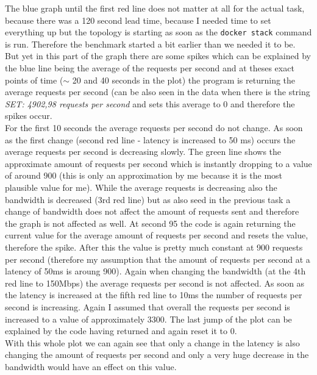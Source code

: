 \documentclass{article}
\begin{document}
	\begin{adjustwidth}{2em}{2em}
		The blue graph until the first red line does not matter at all for the actual task, because there was a 120 second lead time, because I needed time to set everything up but the topology is starting as soon as the \texttt{docker stack} command is run. Therefore the benchmark started a bit earlier than we needed it to be. But yet in this part of the graph there are some spikes which can be explained by the blue line being the average of the requests per second and at theses exact points of time ($\sim$ 20 and 40 seconds in the plot) the program is returning the average requests per second (can be also seen in the data when there is the string \textit{SET: 4902,98 requests per second} and sets this average to 0 and therefore the spikes occur. \\
		For the first 10 seconds the average requests per second do not change. As soon as the first change (second red line - latency is increased to 50 ms) occurs the average requests per second is decreasing slowly. The green line shows the approximate amount of requests per second which is instantly dropping to a value of around 900 (this is only an approximation by me because it is the most plausible value for me). While the average requests is decreasing also the bandwidth is decreased (3rd red line) but as also seed in the previous task a change of bandwidth does not affect the amount of requests sent and therefore the graph is not affected as well. At second 95 the code is again returning the current value for the average amount of requests per second and resets the value, therefore the spike. After this the value is pretty much constant at 900 requests per second (therefore my assumption that the amount of requests per second at a latency of 50ms is aroung 900). Again when changing the bandwidth (at the 4th red line to 150Mbps) the average requests per second is not affected. As soon as the latency is increased at the fifth red line to 10ms the number of requests per second is increasing. Again I assumed that overall the requests per second is increased to a value of approximately 3300. The last jump of the plot can be explained by the code having returned and again reset it to 0. \\
		With this whole plot we can again see that only a change in the latency is also changing the amount of requests per second and only a very huge decrease in the bandwidth would have an effect on this value.
	\end{adjustwidth}
\end{document}

